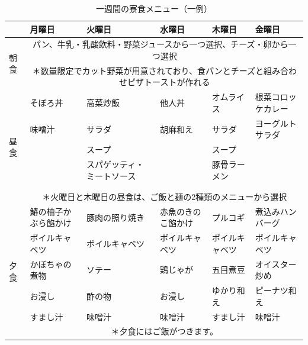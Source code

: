 \begin{table}[ht]
  {\small
  \caption*{一週間の寮食メニュー（一例）}
  \begin{tabular}{|l|p{}p{}p{}p{}p{}|}
  \hline
   & \multicolumn{1}{l|}{月曜日} & \multicolumn{1}{l|}{火曜日} & \multicolumn{1}{l|}{水曜日} & \multicolumn{1}{l|}{木曜日} & 金曜日 \\ \hline
  \multirow{2}{*}{朝食} & \multicolumn{5}{c|}{パン、牛乳・乳酸飲料・野菜ジュースから一つ選択、チーズ・卵から一つ選択} \\
   & \multicolumn{5}{c|}{＊数量限定でカット野菜が用意されており、食パンとチーズと組み合わせピザトーストが作れる} \\ \hline
  \multirow{7}{*}{昼食} & \multicolumn{1}{l|}{そぼろ丼} & \multicolumn{1}{l|}{高菜炒飯} & \multicolumn{1}{l|}{他人丼} & \multicolumn{1}{l|}{オムライス} & 根菜コロッケカレー \\
   & \multicolumn{1}{l|}{味噌汁} & \multicolumn{1}{l|}{サラダ} & \multicolumn{1}{l|}{胡麻和え} & \multicolumn{1}{l|}{サラダ} & ヨーグルトサラダ \\
   & \multicolumn{1}{l|}{} & \multicolumn{1}{l|}{スープ} & \multicolumn{1}{l|}{} & \multicolumn{1}{l|}{スープ} &  \\ \cline{2-6} 
   & \multicolumn{1}{l|}{} & \multicolumn{1}{l|}{スパゲッティ・ミートソース} & \multicolumn{1}{l|}{} & \multicolumn{1}{l|}{豚骨ラーメン} &  \\
   & \multicolumn{1}{l|}{} & \multicolumn{1}{l|}{} & \multicolumn{1}{l|}{} & \multicolumn{1}{l|}{} &  \\
   & \multicolumn{1}{l|}{} & \multicolumn{1}{l|}{} & \multicolumn{1}{l|}{} & \multicolumn{1}{l|}{} &  \\ \cline{2-6} 
   & \multicolumn{5}{c|}{＊火曜日と木曜日の昼食は、ご飯と麺の2種類のメニューから選択} \\ \hline
  \multirow{6}{*}{夕食} & \multicolumn{1}{l|}{鰆の柚子かぶら餡かけ} & \multicolumn{1}{l|}{豚肉の照り焼き} & \multicolumn{1}{l|}{赤魚のきのこ餡かけ} & \multicolumn{1}{l|}{プルコギ} & 煮込みハンバーグ \\
   & \multicolumn{1}{l|}{ボイルキャベツ} & \multicolumn{1}{l|}{ボイルキャベツ} & \multicolumn{1}{l|}{ボイルキャベツ} & \multicolumn{1}{l|}{ボイルキャベツ} & ボイルキャベツ \\
   & \multicolumn{1}{l|}{かぼちゃの煮物} & \multicolumn{1}{l|}{ソテー} & \multicolumn{1}{l|}{鶏じゃが} & \multicolumn{1}{l|}{五目煮豆} & オイスター炒め \\
   & \multicolumn{1}{l|}{お浸し} & \multicolumn{1}{l|}{酢の物} & \multicolumn{1}{l|}{お浸し} & \multicolumn{1}{l|}{ゆかり和え} & ピーナツ和え \\
   & \multicolumn{1}{l|}{すまし汁} & \multicolumn{1}{l|}{味噌汁} & \multicolumn{1}{l|}{味噌汁} & \multicolumn{1}{l|}{すまし汁} & 味噌汁 \\ \cline{2-6} 
   & \multicolumn{5}{c|}{＊夕食にはご飯がつきます。} \\ \hline
  \end{tabular}
  }
\end{table}


